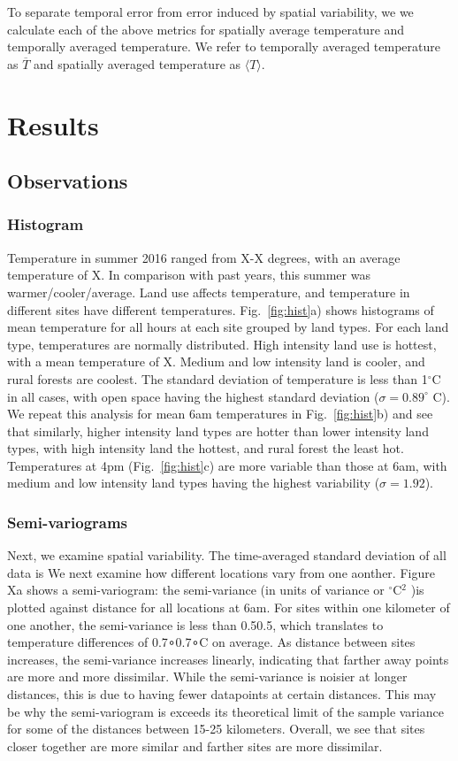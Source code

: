 \documentclass[draft,linenumbers]{agujournal}
\begin{document}
To separate temporal error from error induced by spatial variability, we we calculate each of the above metrics for spatially average temperature and temporally averaged temperature. We refer to temporally averaged temperature as $\overline{T}$ and spatially averaged temperature as $\langle T \rangle$. 
\section{Results}\label{sec:results} 
\subsection{Observations}
\subsubsection{Histogram}
Temperature in summer 2016 ranged from X-X degrees, with an average temperature of X. In comparison with past years, this summer was warmer/cooler/average. Land use affects temperature, and temperature in different sites have different temperatures. Fig.~\ref{fig:hist}a) shows histograms of mean temperature for all hours at each site grouped by land types. For each land type, temperatures are normally  distributed. 
High intensity land use is hottest, with a mean temperature of X. Medium and low intensity land is cooler, and rural forests are coolest. The standard deviation of temperature is less than 1$^\circ$C in all cases, with open space having the highest standard deviation ($\sigma = 0.89^\circ$ C). We repeat this analysis for mean 6am temperatures in Fig.~\ref{fig:hist}b) and see that similarly, higher intensity land types are hotter than lower intensity land types, with high intensity land the hottest, and rural forest the least hot. Temperatures at 4pm (Fig.~\ref{fig:hist}c) are more variable than those at 6am, with medium and low intensity land types having the highest variability ($\sigma = 1.92$). 

\subsubsection{Semi-variograms}
Next, we examine spatial variability. The time-averaged standard deviation of all data is  We next examine how different locations vary from one aonther. Figure Xa shows a semi-variogram: the semi-variance (in units of variance or $^\circ$C$^2$ )is plotted against distance for all locations at 6am. For sites within one kilometer of one another, the semi-variance is less than 0.50.5, which translates to temperature differences of 0.7∘0.7∘C on average. As distance between sites increases, the semi-variance increases linearly, indicating that farther away points are more and more dissimilar. While the semi-variance is noisier at longer distances, this is due to having fewer datapoints at certain distances. This may be why the semi-variogram is exceeds its theoretical limit of the sample variance for some of the distances between 15-25 kilometers. Overall, we see that sites closer together are more similar and farther sites are more dissimilar.
\end{document}
